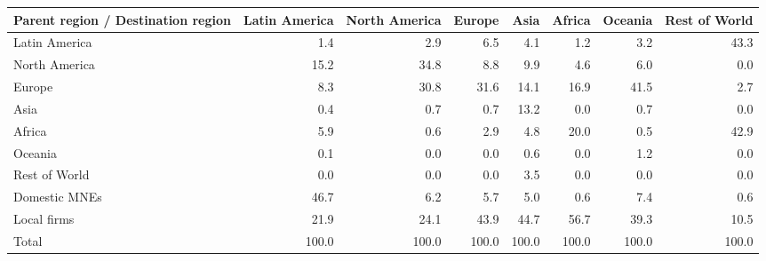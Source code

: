 \begin{tabular}{lrrrrrrr}
\toprule
Parent region / Destination region & Latin America & North America & Europe & Asia & Africa & Oceania & Rest of World \\
\midrule
Latin America & 1.4 & 2.9 & 6.5 & 4.1 & 1.2 & 3.2 & 43.3 \\
North America & 15.2 & 34.8 & 8.8 & 9.9 & 4.6 & 6.0 & 0.0 \\
Europe & 8.3 & 30.8 & 31.6 & 14.1 & 16.9 & 41.5 & 2.7 \\
Asia & 0.4 & 0.7 & 0.7 & 13.2 & 0.0 & 0.7 & 0.0 \\
Africa & 5.9 & 0.6 & 2.9 & 4.8 & 20.0 & 0.5 & 42.9 \\
Oceania & 0.1 & 0.0 & 0.0 & 0.6 & 0.0 & 1.2 & 0.0 \\
Rest of World & 0.0 & 0.0 & 0.0 & 3.5 & 0.0 & 0.0 & 0.0 \\
Domestic MNEs & 46.7 & 6.2 & 5.7 & 5.0 & 0.6 & 7.4 & 0.6 \\
Local firms & 21.9 & 24.1 & 43.9 & 44.7 & 56.7 & 39.3 & 10.5 \\
\midrule
Total & 100.0 & 100.0 & 100.0 & 100.0 & 100.0 & 100.0 & 100.0 \\
\bottomrule
\end{tabular}
